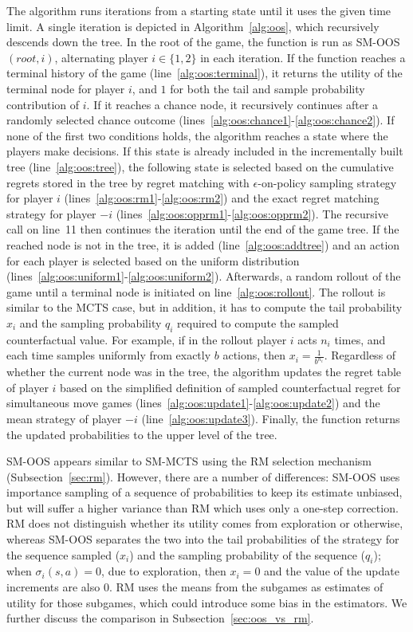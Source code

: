 {The algorithm runs iterations from a starting state until it uses the given time limit. A single iteration is depicted in Algorithm~\ref{alg:oos},
which recursively descends down the tree. In the root of the game, the function is run as SM-OOS$(root, i)$, alternating player $i\in\{1,2\}$ in
each iteration. If the function reaches a terminal history of the game (line~\ref{alg:oos:terminal}), it returns the utility of the terminal node
for player $i$, and $1$ for both the tail and sample probability contribution of $i$. If it reaches a chance node, it recursively continues after
a randomly selected chance outcome (lines~\ref{alg:oos:chance1}-\ref{alg:oos:chance2}). If none of the first two conditions holds, the algorithm
reaches a state where the players make decisions. If this state is already included in the incrementally built tree (line~\ref{alg:oos:tree}), the
following state is selected based on the cumulative regrets stored in the tree by regret matching with $\epsilon$-on-policy sampling strategy for
player $i$ (lines~\ref{alg:oos:rm1}-\ref{alg:oos:rm2}) and the exact regret matching strategy for player $-i$ (lines~\ref{alg:oos:opprm1}-\ref{alg:oos:opprm2}).
The recursive call on line~11 then continues the iteration until the end of the game tree. If the reached node is not in the tree,
it is added (line~\ref{alg:oos:addtree}) and an action for each player is selected based on the uniform distribution
(lines~\ref{alg:oos:uniform1}-\ref{alg:oos:uniform2}). Afterwards, a random rollout of the game until a terminal node is initiated on line~\ref{alg:oos:rollout}.
The rollout is similar to the MCTS case, but in addition, it has to compute the tail probability $x_i$ and the sampling probability $q_i$
required to compute the sampled counterfactual value.
For example, if in the rollout player $i$ acts $n_i$ times, and each time samples uniformly from exactly $b$ actions, then $x_i = \frac{1}{b^{n_i}}$.
Regardless of whether the current node was in the tree, the algorithm updates the regret table of player $i$ based on the simplified definition of sampled counterfactual regret for simultaneous move games (lines~\ref{alg:oos:update1}-\ref{alg:oos:update2}) and the mean strategy of player $-i$ (line~\ref{alg:oos:update3}).
Finally, the function returns the updated probabilities to the upper level of the tree.

SM-OOS appears similar to SM-MCTS using the RM selection mechanism (Subsection~\ref{sec:rm}). However, there are a number of differences:
SM-OOS uses importance sampling of a sequence of probabilities to keep its estimate unbiased, but will suffer a higher variance than RM which uses only a one-step correction.
RM does not distinguish whether its utility comes from exploration or otherwise, whereas SM-OOS separates the two into the tail probabilities of the strategy for the sequence
sampled ($x_i$) and the sampling probability of the sequence ($q_i$); when $\sigma_i(s,a) = 0$, due to exploration, then $x_i = 0$ and the value of the update increments
are also $0$. RM uses the means from the subgames
as estimates of utility for those subgames, which could introduce some bias in the estimators. We further discuss the comparison in Subsection~\ref{sec:oos_vs_rm}.}

